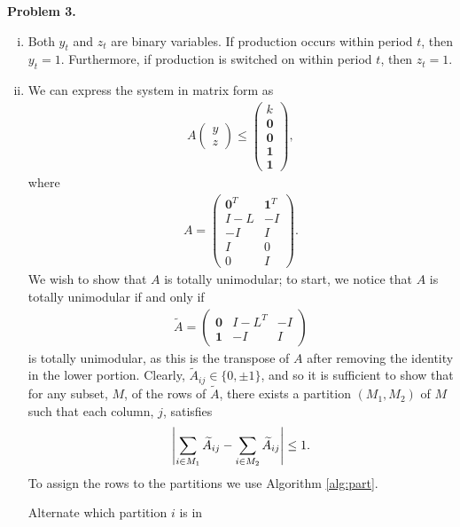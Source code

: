 \documentclass[11pt,a4paper]{article}
\let\originalleft\left
\let\originalright\right
\renewcommand{\left}{\mathopen{}\mathclose\bgroup\originalleft}
\renewcommand{\right}{\aftergroup\egroup\originalright}
\begin{document}
\textbf{Problem 3.}
\begin{enumerate}[i)]
	\item Both $y_t$ and $z_t$ are binary variables. If production occurs within period $t$, then $y_t = 1$. Furthermore, if production is switched on within period $t$, then $z_t = 1$.
	\item We can express the system in matrix form as
	\begin{align*}
		A
		\begin{pmatrix}
			y \\
			z
		\end{pmatrix}
		\leq
		\begin{pmatrix}
			k \\
			\mathbf{0} \\
			\mathbf{0} \\
			\mathbf{1} \\
			\mathbf{1}
		\end{pmatrix},
	\end{align*}
	where
	\begin{align*}
		A =
		\begin{pmatrix}
			\mathbf{0}^T & \mathbf{1}^T \\
			I - L & -I \\
			-I & I \\
			I & 0 \\
			0 & I
		\end{pmatrix}.
	\end{align*}
	We wish to show that $A$ is totally unimodular; to start, we notice that $A$ is totally unimodular if and only if
	\begin{align*}
		\widetilde{A} =
		\begin{pmatrix}
			\mathbf{0} & I - L^T & -I \\
			\mathbf{1} & -I & I
		\end{pmatrix}
	\end{align*}
	is totally unimodular, as this is the transpose of $A$ after removing the identity in the lower portion. Clearly, $\widetilde{A}_{ij} \in \{ 0, \pm 1 \}$, and so it is sufficient to show that for any subset, $M$, of the rows of $\widetilde{A}$, there exists a partition $(M_1, M_2)$ of $M$ such that each column, $j$, satisfies
	\begin{align*}
		\left| \sum_{i \in M_1} \widetilde{A}_{ij} - \sum_{i \in M_2} \widetilde{A}_{ij} \right| \leq 1.
	\end{align*}
	To assign the rows to the partitions we use Algorithm \ref{alg:part}.
	\begin{algorithm}[tbp]
	    \begin{algorithmic}%
				\State Alternate which partition $i$ is in
			\EndFor


\end{algorithmic}
\end{algorithm}
\end{enumerate}
\end{document}
